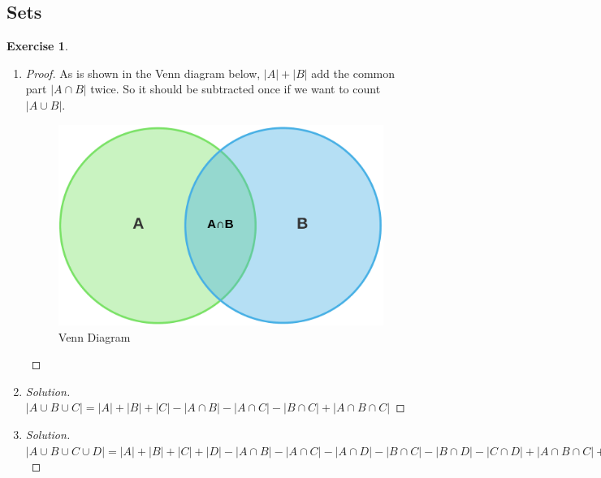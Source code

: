 \documentclass[12pt,a4]{article}
\newtheorem{exercise}[theorem]{Exercise}
\newenvironment{solution}
  {\renewcommand\qedsymbol{$\blacksquare$}\begin{proof}[Solution]}
  {\end{proof}}
\begin{document}
\subsection{Sets}

\begin{exercise}
\end{exercise}

\begin{enumerate}
\item \begin{proof}
As is shown in the Venn diagram below, $\left\vert{A}\right\vert + \left\vert{B}\right\vert$ add the common part $\left\vert{A\cap B}\right\vert $ twice. So it should be subtracted once if we want to count $\left\vert{A \cup B}\right\vert $.
\begin{figure}[h]
\centering
\includegraphics[scale=0.1]{Venn}
\caption{Venn Diagram}
\end{figure}
\end{proof}
\item \begin{solution}
$\left\vert{A\cup B\cup C}\right\vert = \left\vert{A}\right\vert + \left\vert{B}\right\vert + \left\vert{C}\right\vert - \left\vert{A\cap B}\right\vert - \left\vert{A\cap C}\right\vert - \left\vert{B \cap C}\right\vert + \left\vert{A\cap B \cap C}\right\vert$
\end{solution}
\item \begin{solution}
$\left\vert{A\cup B\cup C \cup D}\right\vert = \left\vert{A}\right\vert + \left\vert{B}\right\vert + \left\vert{C}\right\vert + \left\vert{D}\right\vert - \left\vert{A\cap B}\right\vert - \left\vert{A\cap C}\right\vert - \left\vert{A \cap D}\right\vert - \left\vert{B \cap C}\right\vert - \left\vert{B \cap D}\right\vert - \left\vert{C \cap D}\right\vert + \left\vert{A\cap B \cap C}\right\vert + \left\vert{A\cap B \cap D}\right\vert + \left\vert{A\cap C \cap D}\right\vert + \left\vert{B\cap C \cap D}\right\vert - \left\vert{A\cap B \cap C\cap D}\right\vert$
\end{solution}
\end{enumerate}
\end{document}
